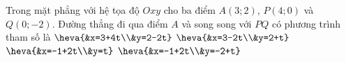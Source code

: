 \begin{ex}%
	Trong mặt phẳng với hệ tọa độ $Oxy$ cho ba điểm $A(3;2)$, $P(4;0)$ và $Q(0;-2)$. Đường thẳng đi qua điểm $A$ và song song với $PQ$ có phương trình tham số là
		\choice
	{$\heva{&x=3+4t\\&y=2-2t}$}
	{$\heva{&x=3-2t\\&y=2+t}$}
	{\True $\heva{&x=-1+2t\\&y=t}$}
	{$\heva{&x=-1+2t\\&y=-2+t}$}
\end{ex}


